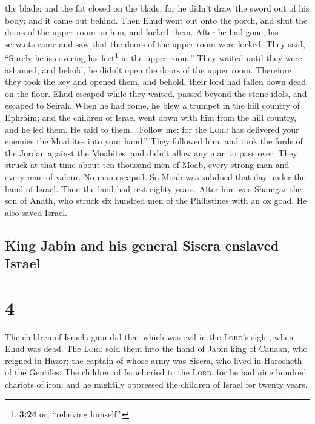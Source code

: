 the blade; and the fat closed on the blade, for he didn't draw the sword
out of his body; and it came out behind.  Then Ehud went
out onto the porch, and shut the doors of the upper room on him, and
locked them.  After he had gone, his servants came and
saw that the doors of the upper room were locked. They said, ``Surely he
is covering his feet\footnote{\textbf{3:24} or, ``relieving himself''.}
in the upper room.''  They waited until they were
ashamed; and behold, he didn't open the doors of the upper room.
Therefore they took the key and opened them, and behold, their lord had
fallen down dead on the floor.  Ehud escaped while they
waited, passed beyond the stone idols, and escaped to Seirah.
 When he had come, he blew a trumpet in the hill country
of Ephraim; and the children of Israel went down with him from the hill
country, and he led them.  He said to them, ``Follow me;
for the \textsc{Lord} has delivered your enemies the Moabites into your
hand.'' They followed him, and took the fords of the Jordan against the
Moabites, and didn't allow any man to pass over.  They
struck at that time about ten thousand men of Moab, every strong man and
every man of valour. No man escaped.  So Moab was subdued
that day under the hand of Israel. Then the land had rest eighty years.
 After him was Shamgar the son of Anath, who struck six
hundred men of the Philistines with an ox goad. He also saved Israel.

\hypertarget{king-jabin-and-his-general-sisera-enslaved-israel}{%
\subsection{King Jabin and his general Sisera enslaved
Israel}\label{king-jabin-and-his-general-sisera-enslaved-israel}}

\hypertarget{section-3}{%
\section{4}\label{section-3}}

 The children of Israel again did that which was evil in
the \textsc{Lord}'s sight, when Ehud was dead.  The
\textsc{Lord} sold them into the hand of Jabin king of Canaan, who
reigned in Hazor; the captain of whose army was Sisera, who lived in
Harosheth of the Gentiles.  The children of Israel cried
to the \textsc{Lord}, for he had nine hundred chariots of iron; and he
mightily oppressed the children of Israel for twenty years.

